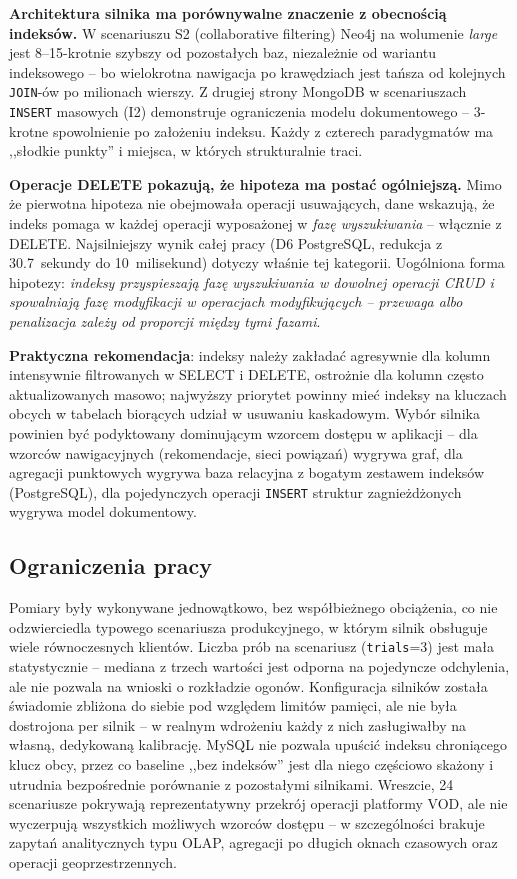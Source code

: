 \textbf{Architektura silnika ma porównywalne znaczenie z obecnością
indeksów.} W scenariuszu S2 (collaborative filtering) Neo4j na
wolumenie \emph{large} jest 8--15-krotnie szybszy od pozostałych baz,
niezależnie od wariantu indeksowego -- bo wielokrotna nawigacja
po krawędziach jest tańsza od kolejnych \texttt{JOIN}-ów po milionach
wierszy. Z drugiej strony MongoDB w scenariuszach \texttt{INSERT}
masowych (I2) demonstruje ograniczenia modelu dokumentowego -- 3-krotne
spowolnienie po założeniu indeksu. Każdy z czterech paradygmatów ma
,,słodkie punkty'' i miejsca, w których strukturalnie traci.

\textbf{Operacje DELETE pokazują, że hipoteza ma postać ogólniejszą.}
Mimo że pierwotna hipoteza nie obejmowała operacji usuwających, dane
wskazują, że indeks pomaga w każdej operacji wyposażonej w \emph{fazę
wyszukiwania} -- włącznie z DELETE. Najsilniejszy wynik całej pracy
(D6 PostgreSQL, redukcja z 30.7~sekundy do 10~milisekund) dotyczy
właśnie tej kategorii. Uogólniona forma hipotezy: \emph{indeksy
przyspieszają fazę wyszukiwania w dowolnej operacji CRUD i spowalniają
fazę modyfikacji w operacjach modyfikujących -- przewaga albo
penalizacja zależy od proporcji między tymi fazami}.

\textbf{Praktyczna rekomendacja}: indeksy należy
zakładać agresywnie dla kolumn intensywnie filtrowanych w SELECT
i DELETE, ostrożnie dla kolumn często aktualizowanych masowo;
najwyższy priorytet powinny mieć indeksy na kluczach obcych w tabelach
biorących udział w usuwaniu kaskadowym. Wybór silnika powinien być
podyktowany dominującym wzorcem dostępu w aplikacji -- dla wzorców
nawigacyjnych (rekomendacje, sieci powiązań) wygrywa graf, dla
agregacji punktowych wygrywa baza relacyjna z bogatym zestawem
indeksów (PostgreSQL), dla pojedynczych operacji \texttt{INSERT}
struktur zagnieżdżonych wygrywa model dokumentowy.

\subsection{Ograniczenia pracy}

Pomiary były wykonywane jednowątkowo, bez współbieżnego obciążenia,
co nie odzwierciedla typowego scenariusza produkcyjnego, w którym
silnik obsługuje wiele równoczesnych klientów. Liczba prób na
scenariusz (\texttt{trials}=3) jest mała statystycznie -- mediana
z trzech wartości jest odporna na pojedyncze odchylenia, ale nie
pozwala na wnioski o rozkładzie ogonów. Konfiguracja silników została
świadomie zbliżona do siebie pod względem limitów pamięci, ale nie
była dostrojona per silnik -- w realnym wdrożeniu każdy z nich
zasługiwałby na własną, dedykowaną kalibrację. MySQL nie pozwala
upuścić indeksu chroniącego klucz obcy, przez co baseline
,,bez indeksów'' jest dla niego częściowo skażony i utrudnia
bezpośrednie porównanie z pozostałymi silnikami. Wreszcie, 24
scenariusze pokrywają reprezentatywny przekrój operacji platformy
VOD, ale nie wyczerpują wszystkich możliwych wzorców dostępu --
w szczególności brakuje zapytań analitycznych typu OLAP, agregacji
po długich oknach czasowych oraz operacji geoprzestrzennych.

